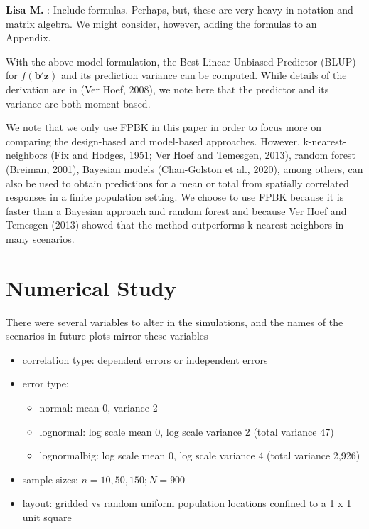 \documentclass[]{elsarticle} %
\providecommand{\tightlist}{%
  \setlength{\itemsep}{0pt}\setlength{\parskip}{0pt}}
\begin{document}
\textbf{Lisa M.} : Include formulas. Perhaps, but, these are very heavy
in notation and matrix algebra. We might consider, however, adding the
formulas to an Appendix.

With the above model formulation, the Best Linear Unbiased Predictor
(BLUP) for \(f(\mathbf{b}'\mathbf{z})\) and its prediction variance can
be computed. While details of the derivation are in (Ver Hoef, 2008), we
note here that the predictor and its variance are both moment-based.

We note that we only use FPBK in this paper in order to focus more on
comparing the design-based and model-based approaches. However,
k-nearest-neighbors (Fix and Hodges, 1951; Ver Hoef and Temesgen, 2013),
random forest (Breiman, 2001), Bayesian models (Chan-Golston et al.,
2020), among others, can also be used to obtain predictions for a mean
or total from spatially correlated responses in a finite population
setting. We choose to use FPBK because it is faster than a Bayesian
approach and random forest and because Ver Hoef and Temesgen (2013)
showed that the method outperforms k-nearest-neighbors in many
scenarios.

\hypertarget{sec:numstudy}{%
\section{Numerical Study}\label{sec:numstudy}}

There were several variables to alter in the simulations, and the names
of the scenarios in future plots mirror these variables

\begin{itemize}
\tightlist
\item
  correlation type: dependent errors or independent errors
\item
  error type:

  \begin{itemize}
  \tightlist
  \item
    normal: mean 0, variance 2
  \item
    lognormal: log scale mean 0, log scale variance 2 (total variance
    47)
  \item
    lognormalbig: log scale mean 0, log scale variance 4 (total variance
    2,926)
  \end{itemize}
\item
  sample sizes: \(n = 10, 50, 150; N = 900\)
\item
  layout: gridded vs random uniform population locations confined to a 1
  x 1 unit square
\end{itemize}
\end{document}
